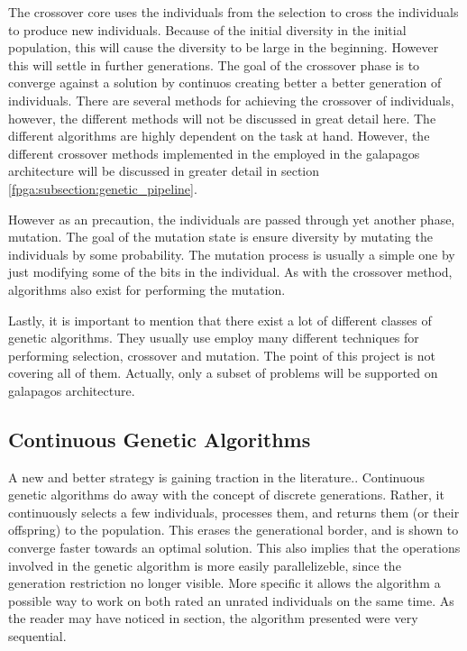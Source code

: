 The crossover core uses the individuals from the selection to cross the individuals to produce new individuals. Because of the initial diversity in the initial population, this will cause the diversity to be large in the beginning. However this will settle in further generations. The goal of the crossover phase is to converge against a solution by continuos creating better a better generation of individuals. There are several methods for achieving the crossover of individuals, however, the different methods will not be discussed in great detail here. The different algorithms are highly dependent on the task at hand. However, the different crossover methods implemented in the employed in the galapagos architecture will be discussed in greater detail in section \vref{fpga:subsection:genetic_pipeline}.

However as an precaution, the individuals are passed through yet another phase, mutation. The goal of the mutation state is ensure diversity by mutating the individuals by some probability. The mutation process is usually a simple one by just modifying some of the bits in the individual. As with the crossover method, algorithms also exist for performing the mutation. 

Lastly, it is important to mention that there exist a lot of different classes of genetic algorithms. They usually use employ many different techniques for performing selection, crossover and mutation. The point of this project is not covering all of them. Actually, only a subset of problems will be supported on galapagos architecture. 




\subsection{Continuous Genetic Algorithms}

A new and better strategy is gaining traction in the literature..
Continuous genetic algorithms do away with the concept of discrete generations.
Rather, it continuously selects a few individuals, processes them, and returns them (or their offspring) to the population.
This erases the generational border, and is shown  to converge faster towards an optimal solution. This also implies that the operations involved in the genetic algorithm is  more easily parallelizeble, since the generation restriction no longer visible. More specific it allows the algorithm a possible way to work on both rated an unrated individuals on the same time. As the reader may have noticed in section, the algorithm presented were very sequential. 

